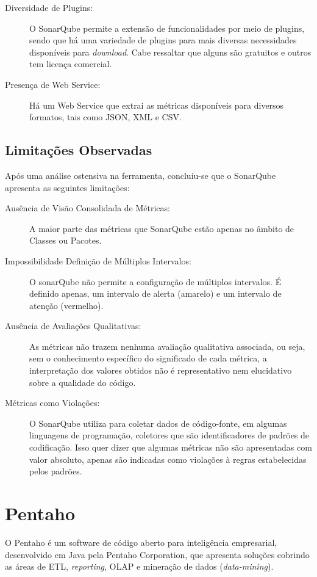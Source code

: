 \begin{description}
\item [Diversidade de Plugins:] O SonarQube permite a 
extensão de funcionalidades por meio de plugins, sendo que há uma variedade de 
plugins para mais diversas necessidades disponíveis para \textit{download}. 
Cabe ressaltar que alguns são gratuitos e outros tem licença comercial.

\item [Presença de Web Service:] Há um Web Service que extrai as métricas 
disponíveis para diversos formatos, tais como JSON, XML e CSV.

\end{description}




\subsection {Limitações Observadas}
Após uma análise ostensiva na ferramenta, concluiu-se que o SonarQube apresenta 
as seguintes limitações:

\begin{description}

\item [Ausência de Visão Consolidada de Métricas:]  A maior parte das métricas
que SonarQube estão apenas no âmbito de Classes ou Pacotes.

\item [Impossibilidade Definição de Múltiplos Intervalos:]  O sonarQube não 
permite a configuração de múltiplos intervalos. É definido apenas, um 
intervalo de alerta (amarelo) e um intervalo de atenção (vermelho).

\item [Ausência de Avaliações Qualitativas:] As métricas não trazem nenhuma 
avaliação qualitativa associada, ou seja, sem o conhecimento específico do 
significado de cada métrica, a interpretação dos valores obtidos não é 
representativo nem elucidativo sobre a qualidade do código.

\item [Métricas como Violações:] O SonarQube utiliza para coletar dados de 
código-fonte, em algumas linguagens de programação, coletores que são 
identificadores de padrões de codificação. Isso quer dizer que algumas métricas 
não são apresentadas com valor absoluto, apenas são indicadas como violações à 
regras estabelecidas pelos padrões. 

\end{description}




\section{Pentaho}

O Pentaho é um software de código aberto para inteligência empresarial, 
desenvolvido em Java pela Pentaho Corporation, que apresenta soluções cobrindo 
as áreas de ETL, \textit{reporting}, OLAP e mineração de dados 
(\textit{data-mining}). 


 
